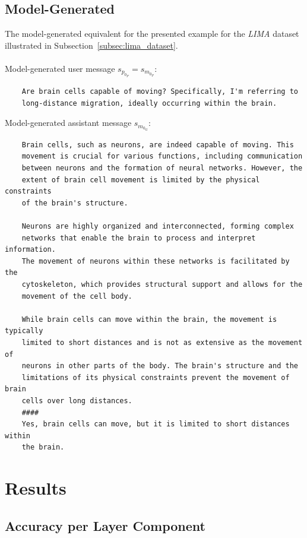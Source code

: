 \subsection{Model-Generated}\label{subsec:appendix_model_generated_sample}
The model-generated equivalent for the presented example for the \emph{LIMA} dataset illustrated in Subsection~\ref{subsec:lima_dataset}.
\\\\
Model-generated user message $s_{p_{0_P}} = s_{m_{0_P}}$:
\begin{verbatim}
    Are brain cells capable of moving? Specifically, I'm referring to
    long-distance migration, ideally occurring within the brain.
\end{verbatim}
Model-generated assistant message $s_{m_{0_G}}$:
\begin{verbatim}
    Brain cells, such as neurons, are indeed capable of moving. This 
    movement is crucial for various functions, including communication 
    between neurons and the formation of neural networks. However, the 
    extent of brain cell movement is limited by the physical constraints
    of the brain's structure.

    Neurons are highly organized and interconnected, forming complex 
    networks that enable the brain to process and interpret information.
    The movement of neurons within these networks is facilitated by the 
    cytoskeleton, which provides structural support and allows for the 
    movement of the cell body.
    
    While brain cells can move within the brain, the movement is typically
    limited to short distances and is not as extensive as the movement of 
    neurons in other parts of the body. The brain's structure and the 
    limitations of its physical constraints prevent the movement of brain
    cells over long distances.
    ####
    Yes, brain cells can move, but it is limited to short distances within 
    the brain.
\end{verbatim}

\section{Results}

\subsection{Accuracy per Layer Component}

